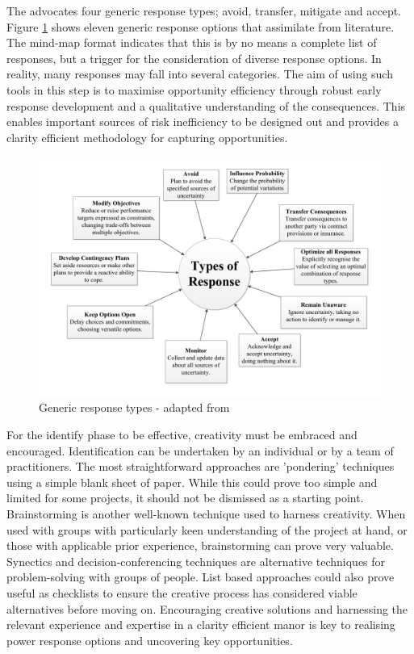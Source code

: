 The \citet{pmi2013} advocates four generic response types; avoid, transfer, mitigate and accept.
Figure \ref{Figure:ResponseTypes} shows eleven generic response options that \citet{chapman} assimilate from literature.
The mind-map format indicates that this is by no means a complete list of responses, but a trigger for the consideration of diverse response options.
In reality, many responses may fall into several categories.
The aim of using such tools in this step is to maximise opportunity efficiency through robust early response development and a qualitative understanding of the consequences. 
This enables important sources of risk inefficiency to be designed out and provides a clarity efficient methodology for capturing opportunities.

\begin{figure}[!h]
  \centering
    \includegraphics[width = \textwidth]{./Figures/ResponseTypes.pdf} 
\caption{Generic response types - adapted from \cite{chapman}}
\label{Figure:ResponseTypes}
\end{figure}

For the identify phase to be effective, creativity must be embraced and encouraged.
Identification can be undertaken by an individual or by a team of practitioners.
The most straightforward approaches are 'pondering' techniques using a simple blank sheet of paper.
While this could prove too simple and limited for some projects, it should not be dismissed as a starting point.
Brainstorming is another well-known technique used to harness creativity.
When used with groups with particularly keen understanding of the project at hand, or those with applicable prior experience, brainstorming can prove very valuable.
Synectics and decision-conferencing techniques are alternative techniques for problem-solving with groups of people.
List based approaches could also prove useful as checklists to ensure the creative process has considered viable alternatives before moving on.
Encouraging creative solutions and harnessing the relevant experience and expertise in a clarity efficient manor is key to realising power response options and uncovering key opportunities.


